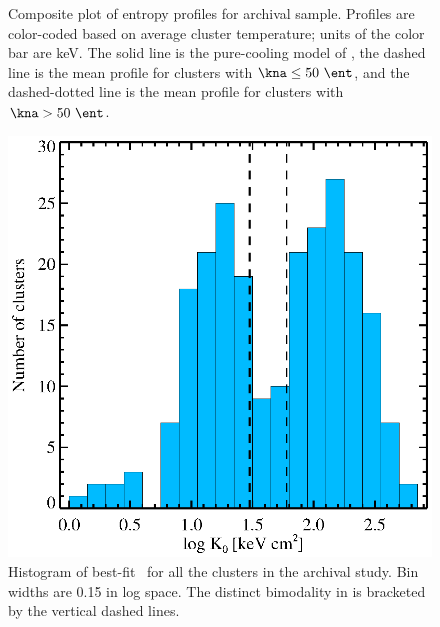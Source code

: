 \documentclass[12pt]{cv}
\begin{document}
\begin{figure}[t]
\begin{minipage}[t]{0.5\linewidth}
        \caption{\footnotesize Composite plot of entropy profiles for
          archival sample. Profiles are color-coded based on average
          cluster temperature; units of the color bar are keV. The
          solid line is the pure-cooling model of \cite{voitbryan},
          the dashed line is the mean profile for clusters with $\kna
          \le 50 ~\ent$, and the dashed-dotted line is the mean profile
          for clusters with $\kna > 50 ~\ent$.}
        \label{fig:splots}
    \end{minipage}
    \hspace{0.1in}
    \begin{minipage}[t]{0.5\linewidth}
        \centering
        \includegraphics*[width=\textwidth, trim=32mm 8mm 32mm 18mm, clip]{k0hist.eps}
        \caption{\footnotesize Histogram of best-fit \kna\ for all the
          clusters in the archival study. Bin widths are 0.15 in log
          space. The distinct bimodality in \kna is bracketed by the
          vertical dashed lines.}
        \label{fig:k0hist}
    \end{minipage}
    \hspace{0.1cm}
    \begin{minipage}[t]{0.5\linewidth}
        \centering

\end{minipage}
\end{figure}
\end{document}
